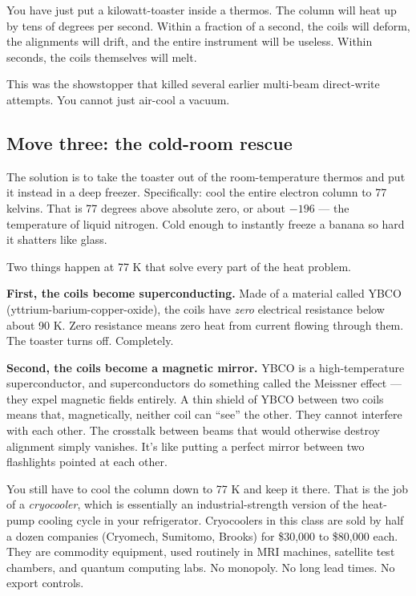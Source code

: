 \documentclass[11pt,letterpaper]{article}
\begin{document}
You have just put a kilowatt-toaster inside a thermos. The column will heat up by tens of degrees per second. Within a fraction of a second, the coils will deform, the alignments will drift, and the entire instrument will be useless. Within seconds, the coils themselves will melt.

This was the showstopper that killed several earlier multi-beam direct-write attempts. You cannot just air-cool a vacuum.

\subsection{Move three: the cold-room rescue}

The solution is to take the toaster out of the room-temperature thermos and put it instead in a deep freezer. Specifically: cool the entire electron column to 77 kelvins. That is 77 degrees above absolute zero, or about $-196$\textcelsius{} --- the temperature of liquid nitrogen. Cold enough to instantly freeze a banana so hard it shatters like glass.

Two things happen at 77 K that solve every part of the heat problem.

\textbf{First, the coils become superconducting.} Made of a material called YBCO (yttrium-barium-copper-oxide), the coils have \emph{zero} electrical resistance below about 90 K. Zero resistance means zero heat from current flowing through them. The toaster turns off. Completely.

\textbf{Second, the coils become a magnetic mirror.} YBCO is a high-temperature superconductor, and superconductors do something called the Meissner effect --- they expel magnetic fields entirely. A thin shield of YBCO between two coils means that, magnetically, neither coil can ``see'' the other. They cannot interfere with each other. The crosstalk between beams that would otherwise destroy alignment simply vanishes. It's like putting a perfect mirror between two flashlights pointed at each other.

You still have to cool the column down to 77 K and keep it there. That is the job of a \emph{cryocooler}, which is essentially an industrial-strength version of the heat-pump cooling cycle in your refrigerator. Cryocoolers in this class are sold by half a dozen companies (Cryomech, Sumitomo, Brooks) for \$30{,}000 to \$80{,}000 each. They are commodity equipment, used routinely in MRI machines, satellite test chambers, and quantum computing labs. No monopoly. No long lead times. No export controls.
\end{document}
